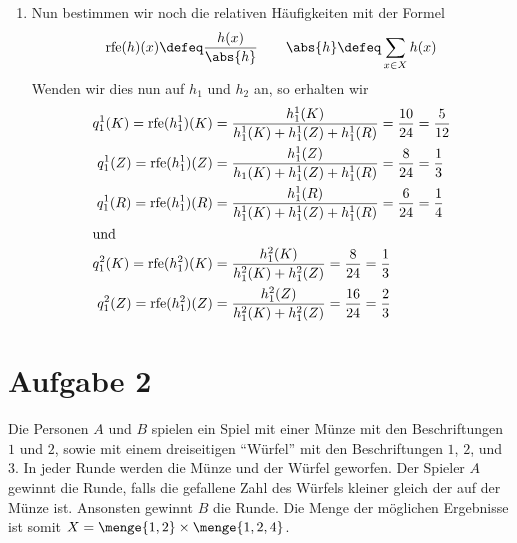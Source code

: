 \documentclass[ngerman, a4paper, 12pt]{article}
\DeclareMathOperator{\rfe}{rfe}
\begin{document}
\begin{enumerate}[label=(\alph*), leftmargin=0pt]

	\item 
	Nun bestimmen wir noch die relativen Häufigkeiten mit der Formel
	\begin{equation*}
		\rfe(h)(x) \defeq \frac{h(x)}{\abs{h}} \quad \mit \quad \abs{h} \defeq \sum_{x \in X} h(x)
	\end{equation*}
	Wenden wir dies nun auf $h_1$ und $h_2$ an, so erhalten wir
	\begin{align*}
		q_1^1(K) = \rfe(h_1^1)(K) &= \frac{h_1^1(K)}{h_1^1(K) + h_1^1(Z) + h_1^1(R)} = \frac{10}{24} = \frac{5}{12} \\
		q_1^1(Z) = \rfe(h_1^1)(Z) &= \frac{h_1^1(Z)}{h_1(K) + h_1^1(Z) + h_1^1(R)} = \frac{8}{24} = \frac{1}{3} \\
		q_1^1(R) = \rfe(h_1^1)(R) &= \frac{h_1^1(R)}{h_1^1(K) + h_1^1(Z) + h_1^1(R)} = \frac{6}{24} = \frac{1}{4} \\
		\intertext{und}
		q_1^2(K) = \rfe(h_1^2)(K) &= \frac{h_1^2(K)}{h_1^2(K) + h_1^2(Z)} = \frac{8}{24} = \frac{1}{3} \\
		q_1^2(Z) = \rfe(h_1^2)(Z) &= \frac{h_1^2(Z)}{h_1^2(K) + h_1^2(Z)} = \frac{16}{24} = \frac{2}{3} \\
	\end{align*}
\end{enumerate}	
		
\section*{Aufgabe 2}

	Die Personen $A$ und $B$ spielen ein Spiel mit einer Münze mit den Beschriftungen $1$ und $2$, sowie mit einem dreiseitigen \enquote{Würfel} mit den Beschriftungen $1$, $2$, und $3$. In jeder Runde werden die
	Münze und der Würfel geworfen. Der Spieler $A$ gewinnt die Runde, falls die gefallene Zahl des Würfels kleiner gleich der auf der Münze ist. Ansonsten gewinnt $B$ die Runde. Die Menge der möglichen Ergebnisse ist somit $X = \menge{1, 2} \times \menge{1,2,4}$.
	 
\end{document}

